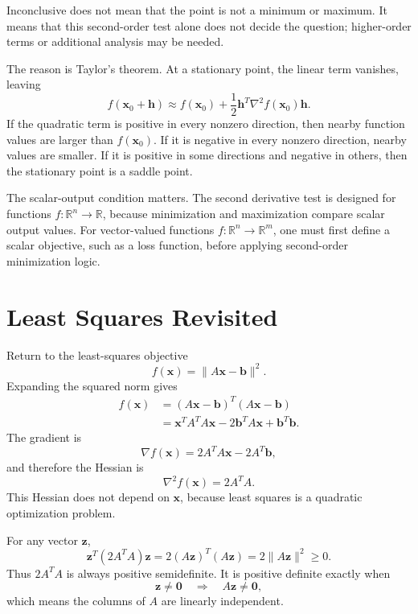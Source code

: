 Inconclusive does not mean that the point is not a minimum or maximum. It means that this second-order test alone does not decide the question; higher-order terms or additional analysis may be needed.

The reason is Taylor's theorem. At a stationary point, the linear term vanishes, leaving
\[
    f(\mathbf{x}_0+\mathbf{h})
    \approx
    f(\mathbf{x}_0)
    +\frac{1}{2}\mathbf{h}^T\nabla^2 f(\mathbf{x}_0)\mathbf{h}.
\]
If the quadratic term is positive in every nonzero direction, then nearby function values are larger than \(f(\mathbf{x}_0)\). If it is negative in every nonzero direction, nearby values are smaller. If it is positive in some directions and negative in others, then the stationary point is a saddle point.

The scalar-output condition matters. The second derivative test is designed for functions \(f:\mathbb{R}^n\to\mathbb{R}\), because minimization and maximization compare scalar output values. For vector-valued functions \(f:\mathbb{R}^n\to\mathbb{R}^m\), one must first define a scalar objective, such as a loss function, before applying second-order minimization logic.

\section{Least Squares Revisited}
\label{mf:least-squares-minimum}

Return to the least-squares objective
\[
    f(\mathbf{x})=\|A\mathbf{x}-\mathbf{b}\|^2.
\]
Expanding the squared norm gives
\[
\begin{aligned}
    f(\mathbf{x})
    &=(A\mathbf{x}-\mathbf{b})^T(A\mathbf{x}-\mathbf{b})\\
    &=\mathbf{x}^TA^TA\mathbf{x}-2\mathbf{b}^TA\mathbf{x}+\mathbf{b}^T\mathbf{b}.
\end{aligned}
\]
The gradient is
\[
    \nabla f(\mathbf{x})=2A^TA\mathbf{x}-2A^T\mathbf{b},
\]
and therefore the Hessian is
\[
    \nabla^2 f(\mathbf{x})=2A^TA.
\]
This Hessian does not depend on \(\mathbf{x}\), because least squares is a quadratic optimization problem.

For any vector \(\mathbf{z}\),
\[
    \mathbf{z}^T(2A^TA)\mathbf{z}
    =2(A\mathbf{z})^T(A\mathbf{z})
    =2\|A\mathbf{z}\|^2
    \ge 0.
\]
Thus \(2A^TA\) is always positive semidefinite. It is positive definite exactly when
\[
    \mathbf{z}\ne\mathbf{0}
    \quad\Longrightarrow\quad
    A\mathbf{z}\ne\mathbf{0},
\]
which means the columns of \(A\) are linearly independent.

